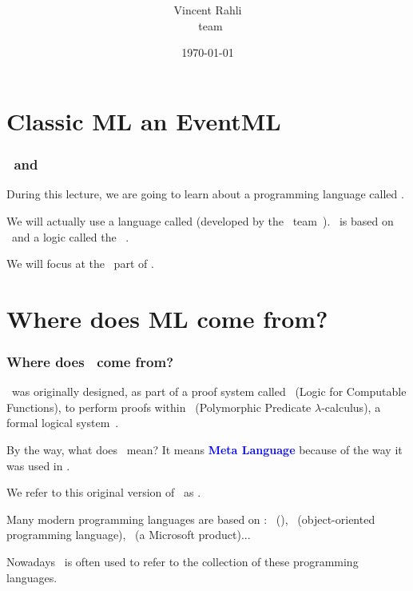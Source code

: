 \documentclass[12pt,red]{beamer}
\title[\cml]{\huge{\mbox{\cml}}\\\vspace*{0.05in}{\small CS 5860 -
    Introduction to Formal Methods}}
\author[\nuprl\ team]{{\scriptsize Vincent Rahli}\\\vspace*{0.1in}\nuprl\ team}
\institute{Cornell University}
\date{\today}
\newcommand{\cemph}[1]{\textcolor{blue}{\textbf{#1}}}
\begin{document}
\begin{frame}
  \titlepage
\end{frame}


\begin{frame}
  \tableofcontents
\end{frame}


\section{Classic ML an EventML}


\begin{frame}
  \frametitle{\cml\ and \eml}

  During this lecture, we are going to learn about a programming
  language called \cemph{\cml}.

  \vspace{0.3in}

  We will actually use a language called \cemph{\eml} (developed by
  the \nuprl\ team~\cite{Constable+al:1986,Kreitz:02,Allen+al:2006}).
  \eml\ is based on \cml\ and a logic called the
  \logicE~\cite{Bickford:2009,Bickford+Constable:2008,Bickford+Constable+Guaspari:2011a}.

  \vspace{0.3in}

  We will focus at the \CML\ part of \EML.
\end{frame}


\section{Where does ML come from?}


\begin{frame}
  \frametitle{Where does \ML\ come from?}

  \ML\ was originally designed, as part of a proof system called
  \LCF\ (Logic for Computable Functions), to perform proofs within
  \PPL\ (Polymorphic Predicate $\lambda$-calculus), a formal logical
  system~\cite{Gordon+Milner+Morris+Newey+Wadsworth:1978,Gordon+Milner+Wadsworth:1979}.

  \vspace{0.2in}

  By the way, what does \ML\ mean?  It means \cemph{Meta Language}
  because of the way it was used in \LCF.

  \vspace{0.2in}

  We refer to this original version of \ML\ as \CML.

  \vspace{0.2in}

  Many modern programming languages are based on \CML: \SML\ (\StdML),
  \OCAML\ (object-oriented programming language), \fsharp\ (a
  Microsoft product)...

  Nowadays \ML\ is often used to refer to the collection of these
  programming languages.

\end{frame}
\end{document}
